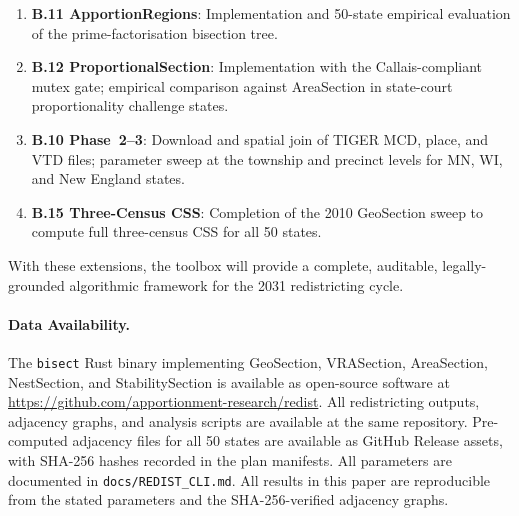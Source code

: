 \begin{enumerate}
  \item \textbf{B.11 ApportionRegions}: Implementation and 50-state empirical
    evaluation of the prime-factorisation bisection tree.
  \item \textbf{B.12 ProportionalSection}: Implementation with the
    Callais-compliant mutex gate; empirical comparison against AreaSection
    in state-court proportionality challenge states.
  \item \textbf{B.10 Phase~2--3}: Download and spatial join of TIGER MCD, place,
    and VTD files; parameter sweep at the township and precinct levels for
    MN, WI, and New England states.
  \item \textbf{B.15 Three-Census CSS}: Completion of the 2010 GeoSection sweep
    to compute full three-census CSS for all 50 states.
\end{enumerate}

With these extensions, the toolbox will provide a complete, auditable,
legally-grounded algorithmic framework for the 2031 redistricting cycle.

\paragraph{Data Availability.}
The \texttt{bisect} Rust binary implementing GeoSection, VRASection,
AreaSection, NestSection, and StabilitySection is available as open-source
software at \url{https://github.com/apportionment-research/redist}.
All redistricting outputs, adjacency graphs, and analysis scripts are available
at the same repository.
Pre-computed adjacency files for all 50 states are available as GitHub Release assets,
with SHA-256 hashes recorded in the plan manifests.
All parameters are documented in \texttt{docs/REDIST\_CLI.md}.
All results in this paper are reproducible from the stated parameters and the
SHA-256-verified adjacency graphs.

